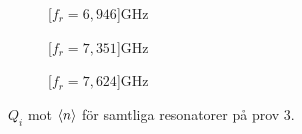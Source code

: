 \documentclass[../../main.tex]{subfiles}
\begin{document}
\begin{figure}[H]
    \begin{subfigure}{0.33\textwidth}
        \centering
        \setlength{}
        \setlength\figureheight{10em}
        
        \caption{\unit[$f_r=6,946$]{GHz}}
    \end{subfigure}
    \begin{subfigure}{0.33\textwidth}
        \centering
        \setlength{}
        \setlength\figureheight{10em}
        
        \caption{\unit[$f_r=7,351$]{GHz}}
    \end{subfigure}
    \begin{subfigure}{0.33\textwidth}
        \centering
        \setlength{}
        \setlength\figureheight{10em}
        
        \caption{\unit[$f_r=7,624$]{GHz}}
    \end{subfigure}
    \caption{$Q_i$ mot $\expval{n}$ för samtliga resonatorer på prov 3.}
\end{figure}
\end{document}
